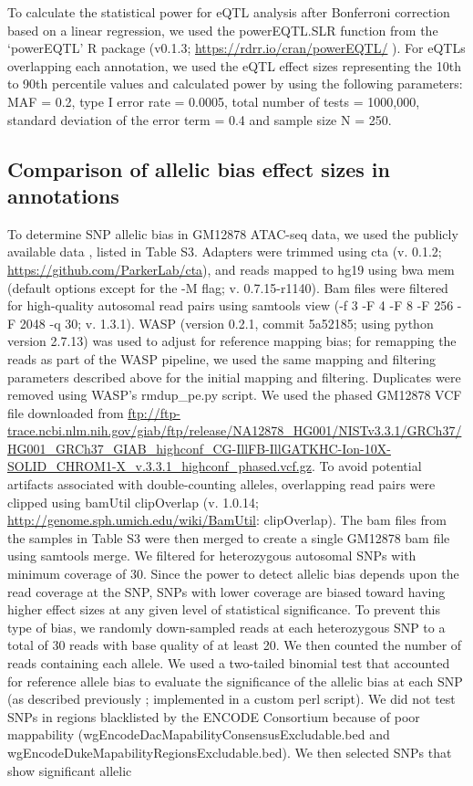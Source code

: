 To calculate the statistical power for eQTL analysis after Bonferroni correction based on a linear regression, we used the powerEQTL.SLR function from the ‘powerEQTL’ R package \cite{dongPowerEQTLPowerSample2017} (v0.1.3; \url{https://rdrr.io/cran/powerEQTL/} ). For eQTLs overlapping each annotation, we used the eQTL effect sizes representing the 10th to 90th percentile values and calculated power by using the following parameters: MAF = 0.2, type I error rate = 0.0005, total number of tests = 1000,000, standard deviation of the error term = 0.4 and sample size N = 250.

\subsection{Comparison of allelic bias effect sizes in annotations}
To determine SNP allelic bias in GM12878 ATAC-seq data, we used the publicly available data \cite{buenrostroTranspositionNativeChromatin2013}, listed in Table S3. Adapters were trimmed using cta (v. 0.1.2; \url{https://github.com/ParkerLab/cta}), and reads mapped to hg19 using bwa mem \cite{liAligningSequenceReads2013} (default options except for the -M flag; v. 0.7.15-r1140). Bam files were filtered for high-quality autosomal read pairs using samtools \cite{liSequenceAlignmentMap2009} view (-f 3 -F 4 -F 8 -F 256 -F 2048 -q 30; v. 1.3.1). WASP \cite{geijnWASPAllelespecificSoftware2015} (version 0.2.1, commit 5a52185; using python version 2.7.13) was used to adjust for reference mapping bias; for remapping the reads as part of the WASP pipeline, we used the same mapping and filtering parameters described above for the initial mapping and filtering. Duplicates were removed using WASP’s rmdup\_pe.py script. We used the phased GM12878 VCF file downloaded from \url{ftp://ftp-trace.ncbi.nlm.nih.gov/giab/ftp/release/NA12878\_HG001/NISTv3.3.1/GRCh37/HG001\_GRCh37\_GIAB\_highconf\_CG-IllFB-IllGATKHC-Ion-10X-SOLID\_CHROM1-X\_v.3.3.1\_highconf_phased.vcf.gz}. To avoid potential artifacts associated with double-counting alleles, overlapping read pairs were clipped using bamUtil clipOverlap (v. 1.0.14; \url{http://genome.sph.umich.edu/wiki/BamUtil}: clipOverlap). The bam files from the samples in Table S3 were then merged to create a single GM12878 bam file using samtools merge. We filtered for heterozygous autosomal SNPs with minimum coverage of 30. Since the power to detect allelic bias depends upon the read coverage at the SNP, SNPs with lower coverage are biased toward having higher effect sizes at any given level of statistical significance. To prevent this type of bias, we randomly down-sampled reads at each heterozygous SNP to a total of 30 reads with base quality of at least 20. We then counted the number of reads containing each allele. We used a two-tailed binomial test that accounted for reference allele bias to evaluate the significance of the allelic bias at each SNP (as described previously \cite{varshneyGeneticRegulatorySignatures2017}; implemented in a custom perl script). We did not test SNPs in regions blacklisted by the ENCODE Consortium because of poor mappability (wgEncodeDacMapabilityConsensusExcludable.bed and wgEncodeDukeMapabilityRegionsExcludable.bed). We then selected SNPs that show significant allelic 